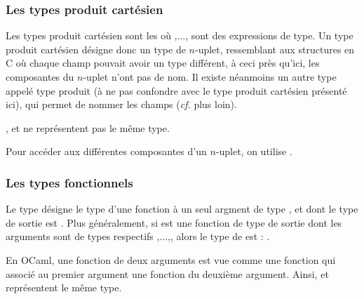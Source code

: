 		\subsubsection{Les types produit cartésien}
			
			Les types produit cartésien sont les  où ,..., sont des expressions de type. \nt
			Un type produit cartésien désigne donc un type de \(n\)-uplet, ressemblant aux structures en C où chaque champ pouvait avoir un type différent, à ceci près qu'ici, les composantes du \(n\)-uplet n'ont pas de nom. Il existe néanmoins un autre type appelé type produit (à ne pas confondre avec le type produit cartésien présenté ici), qui permet de nommer les champs (\emph{cf.} plus loin).
			
			\begin{Exemple}
			\end{Exemple}
			\vs{2}
			
			\begin{Remarque}
				,  et  ne représentent pas le même type.
			\end{Remarque}
			\vs{2}
			
			Pour accéder aux différentes composantes d'un \(n\)-uplet, on utilise \caml{let in}.
			\vs{2}
			\begin{Exemple}
				
			\end{Exemple}
			
		\subsubsection{Les types fonctionnels}
		
			Le type  désigne le type d'une fonction à un seul argment de type , et dont le type de sortie est . Plus généralement, si  est une fonction de type de sortie  dont les arguments sont de types respectifs ,...,, alors le type de  est : \caml{t@$_1$@ -> ... -> t@$_n$@ -> t@$_s$@}.
			
			\begin{Exemple}
			\end{Exemple}
			
			En OCaml, une fonction de deux arguments est vue comme une fonction qui associé au premier argument une fonction du deuxième argument. Ainsi,  et  représentent le même type.
			
